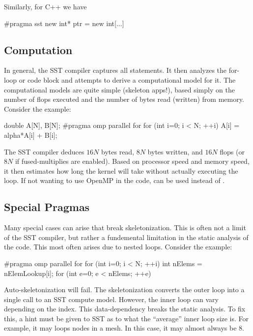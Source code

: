 Similarly, for C++ we have
\begin{CppCode}
#pragma sst new
  int* ptr = new int[...]
\end{CppCode}

\subsection{Computation}
\label{subsec:computation}

In general, the SST compiler captures all  statements.
It then analyzes the for-loop or code block and attempts to derive a computational model for it.
The computational models are quite simple (skeleton apps!), 
based simply on the number of flops executed and the number of bytes read (written) from memory.
Consider the example:

\begin{CppCode}
double A[N], B[N];
#pragma omp parallel for
for (int i=0; i < N; ++i){
  A[i] = alpha*A[i] + B[i];
}
\end{CppCode}
The SST compiler deduces $16N$ bytes read, $8N$ bytes written, and $16N$ flops (or $8N$ if fused-multiplies are enabled).
Based on processor speed and memory speed, it then estimates how long the kernel will take without actually executing the loop.
If not wanting to use OpenMP in the code,  can be used instead of .

\subsection{Special Pragmas}
\label{subsec:specialPragams}

Many special cases can arise that break skeletonization.
This is often not a limit of the SST compiler, but rather a fundemental limitation in the static analysis of the code.
This most often arises due to nested loops. Consider the example:

\begin{CppCode}
#pragma omp parallel for
for (int i=0; i < N; ++i){
  int nElems = nElemLookup[i];
  for (int e=0; e < nElems; ++e){
  }
}
\end{CppCode}
Auto-skeletonization will fail. The skeletonization converts the outer loop into a single call to an SST compute model.
However, the inner loop can vary depending on the index.
This data-dependency breaks the static analysis.
To fix this, a hint must be given to SST as to what the ``average'' inner loop size is.
For example, it may loops nodes in a mesh. In this case, it may almost always be 8.

